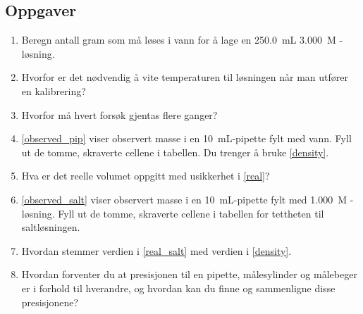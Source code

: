 	\subsection{Oppgaver}
	\begin{enumerate}[label=\alph*)]
		\item Beregn antall gram  som må løses i vann for å lage en \SI{250.0}{mL} \SI{3.000}{M} -løsning.\label{exercise}
		
		\item Hvorfor er det nødvendig å vite temperaturen til løsningen når man utfører en kalibrering?
		
		\item Hvorfor må hvert forsøk gjentas flere ganger?
		
		\item \cref{observed_pip} viser observert masse i en \SI{10}{mL}-pipette fylt med vann. Fyll ut de tomme, skraverte cellene i tabellen. Du trenger å bruke \cref{density}. \label{real} 
		
		\item Hva er det reelle volumet oppgitt med usikkerhet i \ref{real}?
		
		\item \cref{observed_salt} viser observert masse i en \SI{10}{mL}-pipette fylt med \SI{1.000}{M} -løsning. Fyll ut de tomme, skraverte cellene i tabellen for tettheten til saltløsningen. \label{real_salt} 
		
		\item Hvordan stemmer verdien i \ref{real_salt} med verdien i \cref{density}.
		
		\item Hvordan forventer du at presisjonen til en pipette, målesylinder og målebeger er i forhold til hverandre, og hvordan kan du finne og sammenligne disse presisjonene?	
			
	\end{enumerate}

